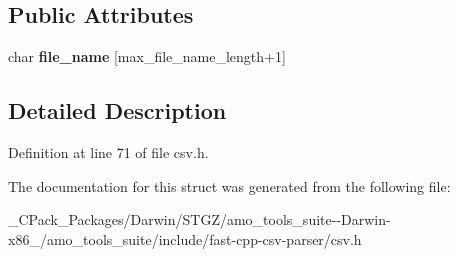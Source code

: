 \subsection*{Public Attributes}
\begin{DoxyCompactItemize}
\item 
\mbox{\label{structio_1_1error_1_1with__file__name_af5db070190940bc279900ad5f2bf5d2c}} 
char {\bfseries file\+\_\+name} \mbox{[}max\+\_\+file\+\_\+name\+\_\+length+1\mbox{]}
\end{DoxyCompactItemize}


\subsection{Detailed Description}


Definition at line 71 of file csv.\+h.



The documentation for this struct was generated from the following file\+:\begin{DoxyCompactItemize}
\item 
\+\_\+\+C\+Pack\+\_\+\+Packages/\+Darwin/\+S\+T\+G\+Z/amo\+\_\+tools\+\_\+suite-\/-\/\+Darwin-\/x86\+\_/amo\+\_\+tools\+\_\+suite/include/fast-\/cpp-\/csv-\/parser/csv.\+h\end{DoxyCompactItemize}
